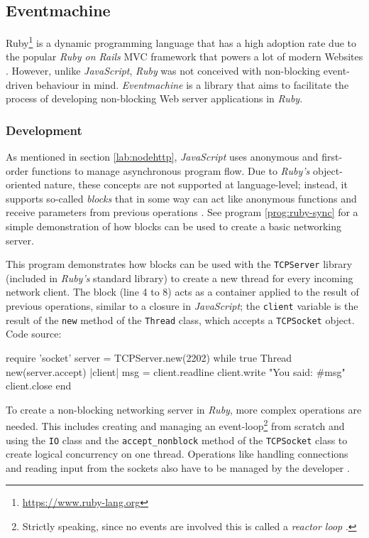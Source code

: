 \subsection{Eventmachine}
Ruby\footnote{\url{https://www.ruby-lang.org}} is a dynamic programming language that has a high adoption rate due to the popular \textit{Ruby on Rails} MVC framework that powers a lot of modern Websites \cite[p. 11]{Orsini2008}. However, unlike \textit{JavaScript}, \textit{Ruby} was not conceived with non-blocking event-driven behaviour in mind. \textit{Eventmachine} is a library that aims to facilitate the process of developing non-blocking Web server applications in \textit{Ruby}.

\subsubsection*{Development}
As mentioned in section \ref{lab:nodehttp}, \textit{JavaScript} uses anonymous and first-order functions to manage asynchronous program flow. Due to \textit{Ruby's} object-oriented nature, these concepts are not supported at language-level; instead, it supports so-called \textit{blocks} that in some way can act like anonymous functions and receive parameters from previous operations \cite{Fitzgerald2007}. See program \ref{prog:ruby-sync} for a simple demonstration of how blocks can be used to create a basic networking server.

\begin{program}
  \caption{This program demonstrates how blocks can be used with the \texttt{TCPServer} library (included in \textit{Ruby's} standard library) to create a new thread for every incoming network client. The block (line 4 to 8) acts as a container applied to the result of previous operations, similar to a closure in \textit{JavaScript}; the \texttt{client} variable is the result of the \texttt{new} method of the \texttt{Thread} class, which accepts a \texttt{TCPSocket} object. Code source: \cite {Gupta2010}}
  \label{prog:ruby-sync}
  \begin{JavaCode}
require 'socket'
server = TCPServer.new(2202)
while true
    Thread new(server.accept){ |client|
        msg = client.readline
        client.write "You said: #{msg}"
        client.close
    }
end
  \end{JavaCode}
\end{program}

To create a non-blocking networking server in \textit{Ruby}, more complex operations are needed. This includes creating and managing an event-loop\footnote{Strictly speaking, since no events are involved this is called a \textit{reactor loop} \cite{Gupta2010}.} from scratch and using the \texttt{IO} class and the \texttt{accept\_nonblock} method of the \texttt{TCPSocket} class to create logical concurrency on one thread. Operations like handling connections and reading input from the sockets also have to be managed by the developer \cite{Gupta2010}.

